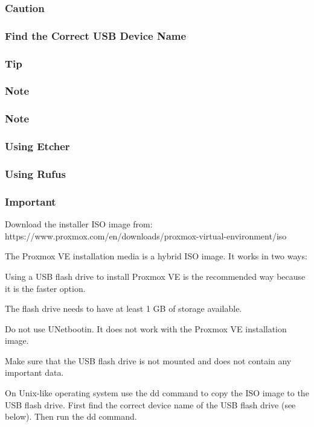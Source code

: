 \subsubsection{Caution}

\subsubsection{Find the Correct USB Device Name}

\subsubsection{Tip}

\subsubsection{Note}

\subsubsection{Note}

\subsubsection{Using Etcher}

\subsubsection{Using Rufus}

\subsubsection{Important}

Download the installer ISO image from: https://www.proxmox.com/en/downloads/proxmox-virtual-environment/iso

The Proxmox VE installation media is a hybrid ISO image. It works in two ways:

Using a USB flash drive to install Proxmox VE is the recommended way because it is the faster option.

The flash drive needs to have at least 1 GB of storage available.

Do not use UNetbootin. It does not work with the Proxmox VE installation image.

Make sure that the USB flash drive is not mounted and does not contain any important data.

On Unix-like operating system use the dd command to copy the ISO image to the USB flash drive. First find the correct device name of the USB flash drive (see below). Then run the dd command.

